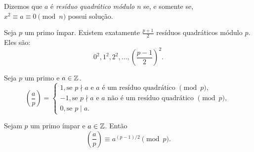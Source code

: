 \documentclass[10pt, a4paper]{report}
\newcommand{\leg}[2]{\left(\frac{#1}{#2}\right)}
\begin{document}
	\begin{defn}
		Dizemos que $a$ é \textit{resíduo quadrático módulo $n$} se, e somente se, $x^2 \equiv a \equiv 0 \pmod{n}$ possui solução.
	\end{defn}
	\begin{prop}
		Seja $p$ um primo ímpar. Existem exatamente $\frac{p+1}{2}$ resíduos quadráticos módulo ${p}$. Eles são:
		\[ 0^2,  1^2, 2^2, \dots, \left( \frac{p-1}{2} \right)^2. \]
	\end{prop}
	\begin{defn}
		Seja $p$ um primo e $a \in \mathbb{Z}$.
		$$\leg{a}{p} =
		\begin{cases}
			1,  \text{se $p \nmid a$ e $a$ é um resíduo quadrático $\pmod{p}$, }\\
			-1, \text{se $p \nmid a$  e $a$ não é um resíduo quadrático $\pmod{p}$, }\\
			0,  \text{se $p \mid a$.}
		\end{cases}$$
	\end{defn}
	\begin{thm}
		Sejam $p$ um primo ímpar e $a \in \mathbb{Z}$. Então
		$$\leg{a}{p} \equiv a^{(p-1)/2}\pmod{p}.$$
	\end{thm}
\end{document}

